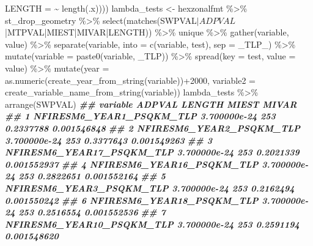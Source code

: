 \documentclass[10pt,landscape,a3paper]{article}
\newenvironment{Shaded}{\begin{snugshade}}{\end{snugshade}}
\newcommand{\AttributeTok}[1]{\textcolor[rgb]{0.77,0.63,0.00}{#1}}
\newcommand{\DecValTok}[1]{\textcolor[rgb]{0.00,0.00,0.81}{#1}}
\newcommand{\DocumentationTok}[1]{\textcolor[rgb]{0.56,0.35,0.01}{\textbf{\textit{#1}}}}
\newcommand{\ErrorTok}[1]{\textcolor[rgb]{0.64,0.00,0.00}{\textbf{#1}}}
\newcommand{\FunctionTok}[1]{\textcolor[rgb]{0.00,0.00,0.00}{#1}}
\newcommand{\NormalTok}[1]{#1}
\newcommand{\OtherTok}[1]{\textcolor[rgb]{0.56,0.35,0.01}{#1}}
\newcommand{\SpecialCharTok}[1]{\textcolor[rgb]{0.00,0.00,0.00}{#1}}
\newcommand{\StringTok}[1]{\textcolor[rgb]{0.31,0.60,0.02}{#1}}
\begin{document}
\begin{Shaded}
\begin{Highlighting}[]
                      \StringTok{\textquotesingle{}LENGTH\textquotesingle{}} \OtherTok{=} \ErrorTok{\textasciitilde{}} \FunctionTok{length}\NormalTok{(.x))))}
\NormalTok{lambda\_tests }\OtherTok{\textless{}{-}}\NormalTok{ hexzonalfmt }\SpecialCharTok{\%\textgreater{}\%}
\NormalTok{  st\_drop\_geometry }\SpecialCharTok{\%\textgreater{}\%}
  \FunctionTok{select}\NormalTok{(}\FunctionTok{matches}\NormalTok{(}\StringTok{\textquotesingle{}SWPVAL$|ADPVAL$|MTPVAL|MIEST|MIVAR|LENGTH\textquotesingle{}}\NormalTok{)) }\SpecialCharTok{\%\textgreater{}\%}
\NormalTok{  unique }\SpecialCharTok{\%\textgreater{}\%}
  \FunctionTok{gather}\NormalTok{(variable, value) }\SpecialCharTok{\%\textgreater{}\%} 
  \FunctionTok{separate}\NormalTok{(variable, }\AttributeTok{into =} \FunctionTok{c}\NormalTok{(}\StringTok{\textquotesingle{}variable\textquotesingle{}}\NormalTok{, }\StringTok{\textquotesingle{}test\textquotesingle{}}\NormalTok{), }\AttributeTok{sep =} \StringTok{\textquotesingle{}\_TLP\_\textquotesingle{}}\NormalTok{) }\SpecialCharTok{\%\textgreater{}\%}
  \FunctionTok{mutate}\NormalTok{(}\AttributeTok{variable =} \FunctionTok{paste0}\NormalTok{(variable, }\StringTok{\textquotesingle{}\_TLP\textquotesingle{}}\NormalTok{)) }\SpecialCharTok{\%\textgreater{}\%} 
  \FunctionTok{spread}\NormalTok{(}\AttributeTok{key =}\NormalTok{ test, }\AttributeTok{value =}\NormalTok{ value) }\SpecialCharTok{\%\textgreater{}\%} 
  \FunctionTok{mutate}\NormalTok{(}\AttributeTok{year =} \FunctionTok{as.numeric}\NormalTok{(}\FunctionTok{create\_year\_from\_string}\NormalTok{(variable))}\SpecialCharTok{+}\DecValTok{2000}\NormalTok{,}
         \AttributeTok{variable2 =} \FunctionTok{create\_variable\_name\_from\_string}\NormalTok{(variable))}
\NormalTok{lambda\_tests }\SpecialCharTok{\%\textgreater{}\%} \FunctionTok{arrange}\NormalTok{(SWPVAL)}
\DocumentationTok{\#\#                              variable       ADPVAL LENGTH     MIEST       MIVAR}
\DocumentationTok{\#\# 1            NFIRESM6\_YEAR1\_PSQKM\_TLP 3.700000e{-}24    253 0.2337788 0.001546848}
\DocumentationTok{\#\# 2            NFIRESM6\_YEAR2\_PSQKM\_TLP 3.700000e{-}24    253 0.3377643 0.001549263}
\DocumentationTok{\#\# 3           NFIRESM6\_YEAR17\_PSQKM\_TLP 3.700000e{-}24    253 0.2021339 0.001552937}
\DocumentationTok{\#\# 4           NFIRESM6\_YEAR16\_PSQKM\_TLP 3.700000e{-}24    253 0.2822651 0.001552164}
\DocumentationTok{\#\# 5            NFIRESM6\_YEAR3\_PSQKM\_TLP 3.700000e{-}24    253 0.2162494 0.001550242}
\DocumentationTok{\#\# 6           NFIRESM6\_YEAR18\_PSQKM\_TLP 3.700000e{-}24    253 0.2516554 0.001552536}
\DocumentationTok{\#\# 7           NFIRESM6\_YEAR10\_PSQKM\_TLP 3.700000e{-}24    253 0.2591194 0.001548620}

\end{Highlighting}
\end{Shaded}
\end{document}
